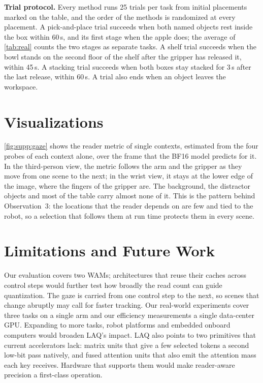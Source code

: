 \noindent\textbf{Trial protocol.}
Every method runs 25 trials per task from initial placements marked on the table, and the order of the methods is randomized at every placement.
A pick-and-place trial succeeds when both named objects rest inside the box within 60\,s, and its first stage when the apple does; the average of \cref{tab:real} counts the two stages as separate tasks.
A shelf trial succeeds when the bowl stands on the second floor of the shelf after the gripper has released it, within 45\,s.
A stacking trial succeeds when both boxes stay stacked for 3\,s after the last release, within 60\,s.
A trial also ends when an object leaves the workspace.

\section{Visualizations}
\label{sec:supp:vis}
\cref{fig:supp:gaze} shows the reader metric of single contexts, estimated from the four probes of each context alone, over the frame that the BF16 model predicts for it.
In the third-person view, the metric follows the arm and the gripper as they move from one scene to the next; in the wrist view, it stays at the lower edge of the image, where the fingers of the gripper are.
The background, the distractor objects and most of the table carry almost none of it.
This is the pattern behind Observation~3: the locations that the reader depends on are few and tied to the robot, so a selection that follows them at run time protects them in every scene.

\section{Limitations and Future Work}
\label{sec:limitations}

Our evaluation covers two WAMs; architectures that reuse their caches across control steps would further test how broadly the read count can guide quantization.
The gaze is carried from one control step to the next, so scenes that change abruptly may call for faster tracking.
Our real-world experiments cover three tasks on a single arm and our efficiency measurements a single data-center GPU. Expanding to more tasks, robot platforms and embedded onboard computers would broaden LAQ's impact.
LAQ also points to two primitives that current accelerators lack: matrix units that give a few selected tokens a second low-bit pass natively, and fused attention units that also emit the attention mass each key receives. Hardware that supports them would make reader-aware precision a first-class operation.
